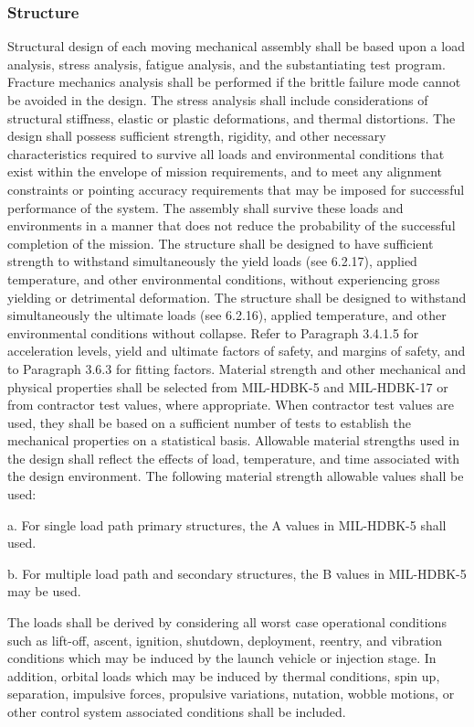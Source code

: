 \documentclass[12pt]{article}
\begin{document}
\subsubsection{Structure} %
Structural design of each moving mechanical assembly shall be based upon a load analysis, stress analysis, fatigue analysis, and the substantiating test program. 
Fracture mechanics analysis shall be performed if the brittle failure mode cannot be avoided in the design. 
The stress analysis shall include considerations of structural stiffness, elastic or plastic deformations, and thermal distortions. 
The design shall possess sufficient strength, rigidity, and other necessary characteristics required to survive all loads and environmental conditions that exist within the envelope of mission requirements, and to meet any alignment constraints or pointing accuracy requirements that may be imposed for successful performance of the system. 
The assembly shall survive these loads and environments in a manner that does not reduce the probability of the successful completion of the mission. 
The structure shall be designed to have sufficient strength to withstand simultaneously the yield loads (see 6.2.17), applied temperature, and other environmental conditions, without experiencing gross yielding or detrimental deformation. 
The structure shall be designed to withstand simultaneously the ultimate loads (see 6.2.16), applied temperature, and other environmental conditions without collapse. 
Refer to Paragraph 3.4.1.5 for acceleration levels, yield and ultimate factors of safety, and margins of safety, and to Paragraph 3.6.3 for fitting factors. 
Material strength and other mechanical and physical properties shall be selected from MIL-HDBK-5 and MIL-HDBK-17 or from contractor test values, where appropriate. 
When contractor test values are used, they shall be based on a sufficient number of tests to establish the mechanical properties on a statistical basis. 
Allowable material strengths used in the design shall reflect the effects of load, temperature, and time associated with the design environment. 
The following material strength allowable values shall be used:

a. For single load path primary structures, the A values in MIL-HDBK-5 shall used.

b. For multiple load path and secondary structures, the B values in MIL-HDBK-5 may be used.

The loads shall be derived by considering all worst case operational conditions such as lift-off, ascent, ignition, shutdown, deployment, reentry, and vibration conditions which may be induced by the launch vehicle or injection stage. 
In addition, orbital loads which may be induced by thermal conditions, spin up, separation, impulsive forces, propulsive variations, nutation, wobble motions, or other control system associated conditions shall be included.
\end{document}
